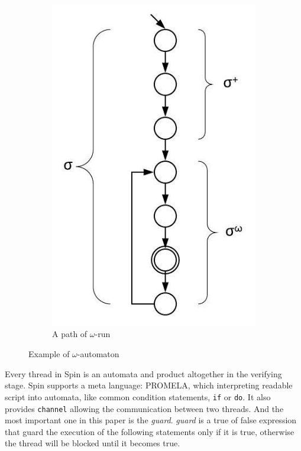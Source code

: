 \begin{figure}
\begin{subfigure}[b]{0.16\textwidth}
\includegraphics[width=\textwidth]{buchi}
\caption{A path of $\omega$-run}
\label{fig:buchi}
\end{subfigure}
\caption{Example of $\omega$-automaton}
\end{figure}

Every thread in Spin is an automata and product altogether in the verifying stage. Spin supports a meta language: PROMELA, which interpreting readable script into automata, like common condition statements, \texttt{if} or \texttt{do}. It also provides \texttt{channel} allowing the communication between two threads. And the most important one in this paper is the \textit{guard}. \textit{guard} is a true of false expression that guard the execution of the following statements only if it is true, otherwise the thread will be blocked until it becomes true.


